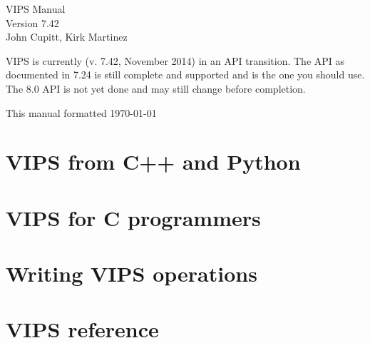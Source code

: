 \documentclass[a4paper,twocolumn,dvips]{book}
\begin{document}

\begin{titlepage}
\thispagestyle{empty}
\begin{center}
\huge
VIPS Manual\\
\large Version 7.42\\
\vspace{0.5in}
\large
John Cupitt,
Kirk Martinez\\
\end{center}

VIPS is currently (v. 7.42, November 2014) in an API transition. The API as
documented in 7.24 is still complete and supported and is the one you should
use. The 8.0 API is not yet done and may still change before completion.

\vspace{5in}

This manual formatted \today
\setcounter{page}{1}
\end{titlepage}

\tableofcontents
\thispagestyle{plain}

\listoffigures
\thispagestyle{plain}

\listoftables
\thispagestyle{plain}

{}
\thispagestyle{plain}
\cfoot{}

\chapter{VIPS from C++ and Python}








\chapter{VIPS for C programmers}








\chapter{Writing VIPS operations}






\chapter{VIPS reference}



\end{document}
